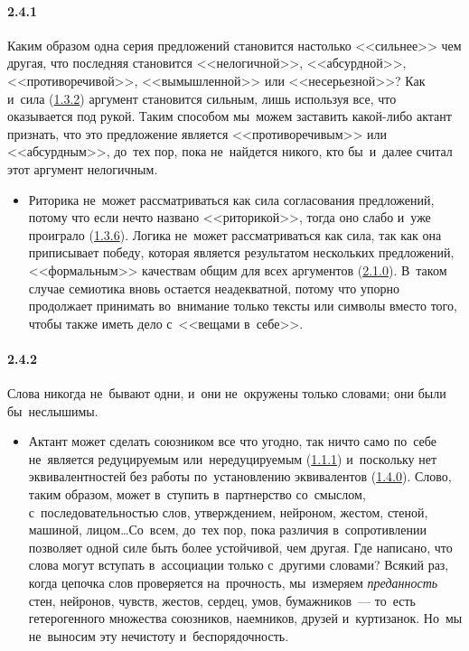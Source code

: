 \paragraph{2.4.1}\hypertarget{par:2.4.1}{} Каким образом одна серия предложений становится настолько <<сильнее>> чем другая, что последняя становится <<нелогичной>>, <<абсурдной>>, <<противоречивой>>, <<вымышленной>> или <<несерьезной>>? Как и~сила (\hyperlink{par:1.3.2}{1.3.2}) аргумент становится сильным, лишь используя все, что оказывается под рукой. Таким способом мы~можем заставить какой-либо актант признать, что это предложение является <<противоречивым>> или <<абсурдным>>, до~тех пор, пока не~найдется никого, кто бы~и~далее считал этот аргумент нелогичным.
	\begin{itemize}
	\item 
	Риторика не~может рассматриваться как сила согласования предложений, потому что если нечто названо <<риторикой>>, тогда оно слабо и~уже проиграло (\hyperlink{par:1.3.6}{1.3.6}). Логика не~может рассматриваться как сила, так как она приписывает победу, которая является результатом нескольких предложений, <<формальным>> качествам общим для всех аргументов (\hyperlink{par:2.1.0}{2.1.0}). В~таком случае семиотика вновь остается неадекватной, потому что упорно продолжает принимать во~внимание только тексты или символы вместо того, чтобы также иметь дело с~<<вещами в~себе>>.
	\end{itemize}

\paragraph{2.4.2}\hypertarget{par:2.4.2}{} Слова никогда не~бывают одни, и~они не~окружены только словами; они были бы~неслышимы.
	\begin{itemize}
	\item 
	Актант может сделать союзником все что угодно, так ничто само по~себе не~является редуцируемым или~нередуцируемым (\hyperlink{par:1.1.1}{1.1.1}) и~поскольку нет эквивалентностей без работы по~установлению эквивалентов (\hyperlink{par:1.4.0}{1.4.0}). Слово, таким образом, может в~ступить в~партнерство со~смыслом, с~последовательностью слов, утверждением, нейроном, жестом, стеной, машиной, лицом\ldots Со~всем, до~тех пор, пока различия в~сопротивлении позволяет одной силе быть более устойчивой, чем другая. Где написано, что слова могут вступать в~ассоциации только с~другими словами? Всякий раз, когда цепочка слов проверяется на~прочность, мы~измеряем {\itshape преданность} стен, нейронов, чувств, жестов, сердец, умов, бумажников~--- то~есть гетерогенного множества союзников, наемников, друзей и~куртизанок. Но~мы не~выносим эту нечистоту и~беспорядочность.
	\end{itemize}

